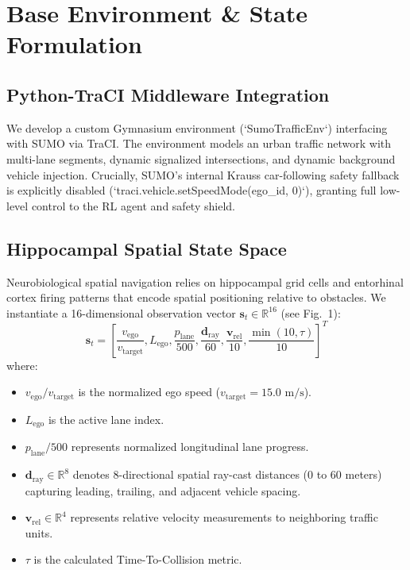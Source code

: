 \documentclass{svproc}
\begin{document}
\section{Base Environment \& State Formulation}\label{sec:env}

\subsection{Python-TraCI Middleware Integration}
We develop a custom Gymnasium environment (`SumoTrafficEnv`) interfacing with SUMO via TraCI. The environment models an urban traffic network with multi-lane segments, dynamic signalized intersections, and dynamic background vehicle injection. Crucially, SUMO's internal Krauss car-following safety fallback is explicitly disabled (`traci.vehicle.setSpeedMode(ego_id, 0)`), granting full low-level control to the RL agent and safety shield.

\subsection{Hippocampal Spatial State Space}
Neurobiological spatial navigation relies on hippocampal grid cells and entorhinal cortex firing patterns that encode spatial positioning relative to obstacles. We instantiate a 16-dimensional observation vector $\mathbf{s}_t \in \mathbb{R}^{16}$ (see Fig.~1):
\begin{equation}\label{eq:state_space}
\mathbf{s}_t = \left[ \frac{v_{\text{ego}}}{v_{\text{target}}}, L_{\text{ego}}, \frac{p_{\text{lane}}}{500}, \frac{\mathbf{d}_{\text{ray}}}{60}, \frac{\mathbf{v}_{\text{rel}}}{10}, \frac{\min(10, \tau)}{10} \right]^T
\end{equation}
where:
\begin{itemize}
    \item $v_{\text{ego}} / v_{\text{target}}$ is the normalized ego speed ($v_{\text{target}} = 15.0\text{ m/s}$).
    \item $L_{\text{ego}}$ is the active lane index.
    \item $p_{\text{lane}} / 500$ represents normalized longitudinal lane progress.
    \item $\mathbf{d}_{\text{ray}} \in \mathbb{R}^8$ denotes 8-directional spatial ray-cast distances (0 to 60 meters) capturing leading, trailing, and adjacent vehicle spacing.
    \item $\mathbf{v}_{\text{rel}} \in \mathbb{R}^4$ represents relative velocity measurements to neighboring traffic units.
    \item $\tau$ is the calculated Time-To-Collision metric.
\end{itemize}
\end{document}
